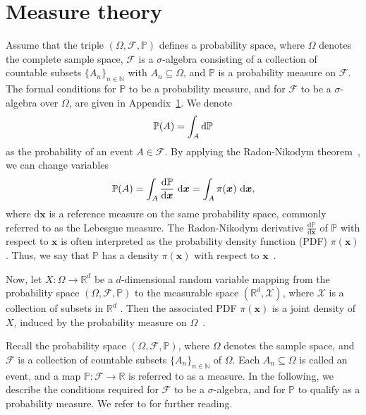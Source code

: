 \section{Measure theory}
\label{ch:Mesure}
Assume that the triple $(\Omega, \mathcal{F}, \mathbb{P})$ defines a probability space, where $\Omega$ denotes the complete sample space, $\mathcal{F}$ is a $\sigma$-algebra consisting of a collection of countable subsets $\{A_n\}_{n \in \mathbb{N}}$ with $A_n \subseteq \Omega$, and $\mathbb{P}$ is a probability measure on $\mathcal{F}$. The formal conditions for $\mathbb{P}$ to be a probability measure, and for $\mathcal{F}$ to be a $\sigma$-algebra over $\Omega$, are given in Appendix~\ref{ch:Mesure}.
We denote
\begin{align}
	\mathbb{P}(A) = \int_A \mathop{}\!\mathrm{d}  \mathbb{P}
\end{align}
as the probability of an event $A \in \mathcal{F}$.
By applying the Radon-Nikodym theorem~\cite{kopp2004measintprob}, we can change variables
\begin{align}
	\mathbb{P}(A) = \int_A \frac{\mathop{}\!\mathrm{d} \mathbb{P}}{\mathop{}\!\mathrm{d} \bm{x}} \, \mathop{}\!\mathrm{d} \bm{x} = \int_A \pi(\bm{x}) \, \mathop{}\!\mathrm{d} \bm{x},
\end{align}
where $\mathrm{d}\bm{x}$ is a reference measure on the same probability space, commonly referred to as the Lebesgue measure. 
The Radon-Nikodym derivative $\frac{\mathrm{d} \mathbb{P}}{\mathrm{d}\bm{x}}$ of $\mathbb{P}$ with respect to $\bm{x}$ is often interpreted as the probability density function (PDF) $\pi(\bm{x})$. Thus, we say that $\mathbb{P}$ has a density $\pi(\bm{x})$ with respect to $\bm{x}$~\cite[Chapter 10]{simonnet1996measprob}.

Now, let $X: \Omega \longrightarrow \mathbb{R}^d$ be a $d$-dimensional random variable mapping from the probability space $(\Omega, \mathcal{F}, \mathbb{P})$ to the measurable space $(\mathbb{R}^d, \mathcal{X})$, where $\mathcal{X}$ is a collection of subsets in $\mathbb{R}^d$ \cite{VesaInvLect}.
Then the associated PDF $\pi(\bm{x})$ is a joint density of $X$, induced by the probability measure on $\Omega$~\cite{VesaInvLect, kopp2004measintprob}.


Recall the probability space $(\Omega, \mathcal{F}, \mathbb{P})$, where $\Omega$ denotes the sample space, and $\mathcal{F}$ is a collection of countable subsets $\{ A_n \}_{n \in \mathbb{N}}$ of $\Omega$. Each $A_n \subseteq \Omega$ is called an event, and a map $\mathbb{P} : \mathcal{F} \rightarrow \mathbb{R}$ is referred to as a measure.
In the following, we describe the conditions required for $\mathcal{F}$ to be a $\sigma$-algebra, and for $\mathbb{P}$ to qualify as a probability measure.
We refer to \cite{lawler2016notes} \cite{kopp2004measintprob} for further reading.

